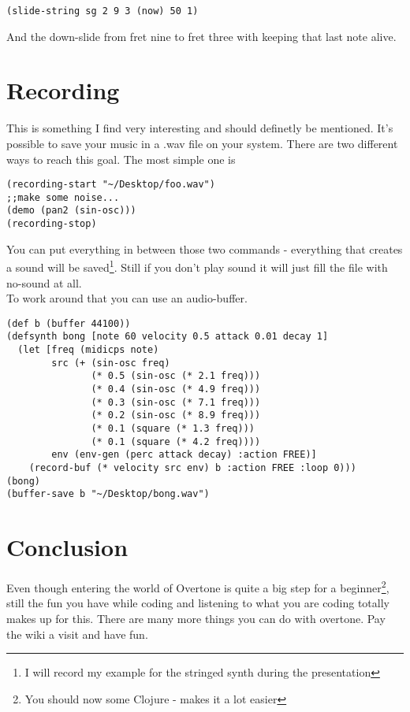 \begin{lstlisting}
(slide-string sg 2 9 3 (now) 50 1)
\end{lstlisting}
And the down-slide from fret nine to fret three with keeping that last note alive.

\chapter{Recording}
This is something I find very interesting and should definetly be mentioned. It's possible to save your music in a .wav file on your system.
There are two different ways to reach this goal. The most simple one is
\begin{lstlisting}
(recording-start "~/Desktop/foo.wav")
;;make some noise...
(demo (pan2 (sin-osc)))
(recording-stop)
\end{lstlisting}
You can put everything in between those two commands - everything that creates a sound will be saved\footnote{I will record my example for the stringed synth during the presentation}.
Still if you don't play sound it will just fill the file with no-sound at all.\\

To work around that you can use an audio-buffer.

\begin{lstlisting}
(def b (buffer 44100))
(defsynth bong [note 60 velocity 0.5 attack 0.01 decay 1] 
  (let [freq (midicps note) 
        src (+ (sin-osc freq) 
               (* 0.5 (sin-osc (* 2.1 freq))) 
               (* 0.4 (sin-osc (* 4.9 freq))) 
               (* 0.3 (sin-osc (* 7.1 freq))) 
               (* 0.2 (sin-osc (* 8.9 freq))) 
               (* 0.1 (square (* 1.3 freq))) 
               (* 0.1 (square (* 4.2 freq)))) 
        env (env-gen (perc attack decay) :action FREE)] 
    (record-buf (* velocity src env) b :action FREE :loop 0))) 
(bong)
(buffer-save b "~/Desktop/bong.wav") 
\end{lstlisting}

\chapter{Conclusion}
\label{chap:end}
Even though entering the world of Overtone is quite a big step for a beginner\footnote{You should now some Clojure - makes it a lot easier}, still the fun you have while coding and listening to what you are coding totally makes up for this.
There are many more things you can do with overtone. Pay the wiki\cite{ow} a visit and have fun.

